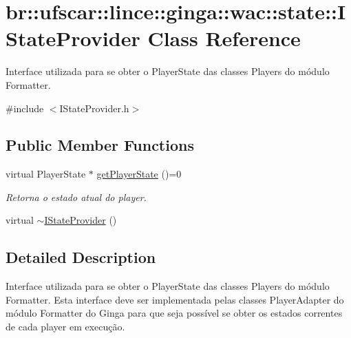\hypertarget{classbr_1_1ufscar_1_1lince_1_1ginga_1_1wac_1_1state_1_1IStateProvider}{
\section{br::ufscar::lince::ginga::wac::state::IStateProvider Class Reference}
\label{classbr_1_1ufscar_1_1lince_1_1ginga_1_1wac_1_1state_1_1IStateProvider}
}


Interface utilizada para se obter o PlayerState das classes Players do módulo Formatter.  




{\ttfamily \#include $<$IStateProvider.h$>$}

\subsection*{Public Member Functions}
\begin{DoxyCompactItemize}
\item 
virtual PlayerState $\ast$ \hyperlink{classbr_1_1ufscar_1_1lince_1_1ginga_1_1wac_1_1state_1_1IStateProvider_a9616b84638f876ff749ffd8c76162f78}{getPlayerState} ()=0
\begin{DoxyCompactList}\small\item\em Retorna o estado atual do player. \item\end{DoxyCompactList}\item 
virtual \hyperlink{classbr_1_1ufscar_1_1lince_1_1ginga_1_1wac_1_1state_1_1IStateProvider_a5a3e4a2209741be59347f6a0d7ba6732}{$\sim$IStateProvider} ()
\end{DoxyCompactItemize}


\subsection{Detailed Description}
Interface utilizada para se obter o PlayerState das classes Players do módulo Formatter. Esta interface deve ser implementada pelas classes PlayerAdapter do módulo Formatter do Ginga para que seja possível se obter os estados correntes de cada player em execução. 

